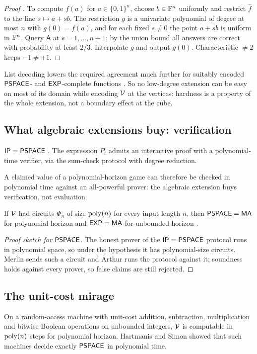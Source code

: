 \begin{proof}[Proof \textup{\cite{BeaverFeigenbaum,Lipton}}]
To compute $f(a)$ for $a\in\{0,1\}^n$, choose $b\in\mathbb{F}^n$ uniformly and restrict $\widehat f$ to the line $s\mapsto a+sb$. The restriction $g$ is a univariate polynomial of degree at most $n$ with $g(0)=f(a)$, and for each fixed $s\neq0$ the point $a+sb$ is uniform in $\mathbb{F}^n$. Query $\mathsf A$ at $s=1,\dots,n+1$; by the union bound all answers are correct with probability at least $2/3$. Interpolate $g$ and output $g(0)$. Characteristic $\neq2$ keeps $-1\neq+1$.
\end{proof}

List decoding lowers the required agreement much further for suitably encoded $\mathsf{PSPACE}$- and $\mathsf{EXP}$-complete functions \cite{STV,TrevisanVadhan}. So no low-degree extension can be easy on most of its domain while encoding $\mathcal{V}$ at the vertices: hardness is a property of the whole extension, not a boundary effect at the cube.

\subsection{What algebraic extensions buy: verification}
\begin{theorem}\label{thm:ip}
$\mathsf{IP}=\mathsf{PSPACE}$ \cite{LFKN,Shamir}. The expression $P_t$ admits an interactive proof with a polynomial-time verifier, via the sum-check protocol with degree reduction.
\end{theorem}
A claimed value of a polynomial-horizon game can therefore be checked in polynomial time against an all-powerful prover: the algebraic extension buys verification, not evaluation.

\begin{corollary}\label{cor:nonuniform}
If $\mathcal{V}$ had circuits $\Phi_n$ of size $\operatorname{poly}(n)$ for every input length $n$, then $\mathsf{PSPACE}=\mathsf{MA}$ for polynomial horizon and $\mathsf{EXP}=\mathsf{MA}$ for unbounded horizon \cite{BFNW}.
\end{corollary}
\begin{proof}[Proof sketch for $\mathsf{PSPACE}$]
The honest prover of the $\mathsf{IP}=\mathsf{PSPACE}$ protocol runs in polynomial space, so under the hypothesis it has polynomial-size circuits. Merlin sends such a circuit and Arthur runs the protocol against it; soundness holds against every prover, so false claims are still rejected.
\end{proof}

\subsection{The unit-cost mirage}
\begin{theorem}\label{thm:unit-cost}
On a random-access machine with unit-cost addition, subtraction, multiplication and bitwise Boolean operations on unbounded integers, $\mathcal{V}$ is computable in $\operatorname{poly}(n)$ steps for polynomial horizon. Hartmanis and Simon \cite{HartmanisSimon} showed that such machines decide exactly $\mathsf{PSPACE}$ in polynomial time.
\end{theorem}

